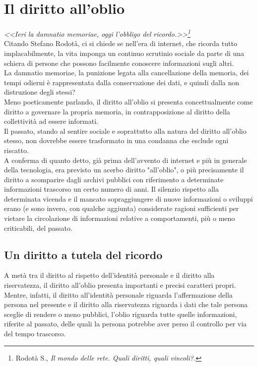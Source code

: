 \section{Il diritto all'oblio}
\textit{<<Ieri la damnatio memoriae, oggi l’obbligo del ricordo.>>\footnote{Rodotà S., \textit{Il mondo delle rete. Quali diritti, quali vincoli?.}}} 
\\Citando Stefano Rodotà, ci si chiede se nell'era di internet, che ricorda tutto implacabilmente, la vita imponga un continuo scrutinio sociale da parte di una schiera di persone che possono facilmente conoscere informazioni sugli altri.
\\La damnatio memoriae, la punizione legata alla cancellazione della memoria, dei tempi odierni è rappresentata dalla conservazione dei dati, e quindi dalla non distruzione degli stessi?
\\Meno poeticamente parlando, il diritto all'oblio si presenta concettualmente come diritto a governare la propria memoria, in contrapposizione al diritto della collettività ad essere informati.
\\Il passato, stando al sentire sociale e soprattutto alla natura del diritto all'oblio stesso, non dovrebbe essere trasformato in una condanna che esclude ogni riscatto. 
\\A conferma di quanto detto, già prima dell'avvento di internet e più in generale della tecnologia, era previsto un acerbo diritto "all'oblio", o più precisamente il diritto a scomparire dagli archivi pubblici con riferimento a determinate informazioni trascorso un certo numero di anni. Il silenzio rispetto alla determinata vicenda e il mancato sopraggiungere di nuove informazioni o sviluppi erano (e sono invero, con qualche aggiunta) considerate ragioni sufficienti per vietare la circolazione di informazioni relative a comportamenti, più o meno criticabili, del passato. 

\subsection{Un diritto a tutela del ricordo}
A metà tra il diritto al rispetto dell'identità personale e il diritto alla riservatezza, il diritto all'oblio presenta importanti e precisi caratteri propri.
\\Mentre, infatti, il diritto all'identità personale riguarda l'affermazione della persona nel presente e il diritto alla riservatezza riguarda i dati che tale persona sceglie di rendere o meno pubblici, l'oblio riguarda tutte quelle informazioni, riferite al passato, delle quali la persona potrebbe aver perso il controllo per via del tempo trascorso.

